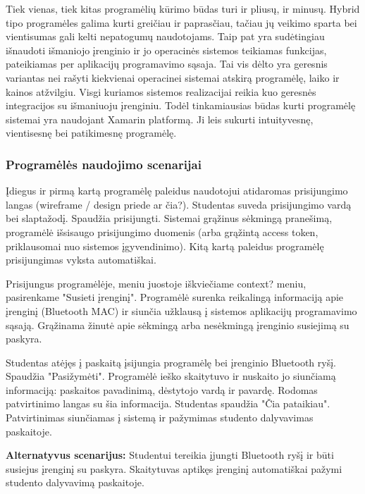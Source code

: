 \documentclass{VUMIFPSkursinis}
\begin{document}

Tiek vienas, tiek kitas programėlių kūrimo būdas turi ir pliusų, ir minusų. Hybrid tipo programėles galima kurti greičiau ir paprasčiau, tačiau jų veikimo sparta bei vientisumas gali kelti nepatogumų naudotojams. Taip pat yra sudėtingiau išnaudoti išmaniojo įrenginio ir jo operacinės sistemos teikiamas funkcijas, pateikiamas per aplikacijų programavimo sąsaja. Tai vis dėlto yra geresnis variantas nei rašyti kiekvienai operacinei sistemai atskirą programėlę, laiko ir kainos atžvilgiu. Visgi kuriamos sistemos realizacijai reikia kuo geresnės integracijos su išmaniuoju įrenginiu. Todėl tinkamiausias būdas kurti programėlę sistemai yra naudojant Xamarin platformą. Ji leis sukurti intuityvesnę, vientisesnę bei patikimesnę programėlę.

\subsubsection{Programėlės naudojimo scenarijai}


Įdiegus ir pirmą kartą programėlę paleidus naudotojui atidaromas prisijungimo langas (wireframe / design priede ar čia?). Studentas suveda prisijungimo vardą bei slaptažodį. Spaudžia prisijungti. Sistemai grąžinus sėkmingą pranešimą, programėlė išsisaugo prisijungimo duomenis (arba grąžintą access token, priklausomai nuo sistemos įgyvendinimo). Kitą kartą paleidus programėlę prisijungimas vyksta automatiškai.


Prisijungus programėlėje, meniu juostoje iškviečiame context? meniu, pasirenkame "Susieti įrenginį". Programėlė surenka reikalingą informaciją apie įrenginį (Bluetooth MAC) ir siunčia užklausą į sistemos aplikacijų programavimo sąsają. Grąžinama žinutė apie sėkmingą arba nesėkmingą įrenginio susiejimą su paskyra.


Studentas atėjęs į paskaitą įsijungia programėlę bei įrenginio Bluetooth ryšį. Spaudžia "Pasižymėti". Programėlė ieško skaitytuvo ir nuskaito jo siunčiamą informaciją: paskaitos pavadinimą, dėstytojo vardą ir pavardę. Rodomas patvirtinimo langas su šia informacija. Studentas spaudžia "Čia pataikiau". Patvirtinimas siunčiamas į sistemą ir pažymimas studento dalyvavimas paskaitoje.

\textbf{Alternatyvus scenarijus:} Studentui tereikia įjungti Bluetooth ryšį ir būti susiejus įrenginį su paskyra. Skaitytuvas aptikęs įrenginį automatiškai pažymi studento dalyvavimą paskaitoje.
\end{document}
